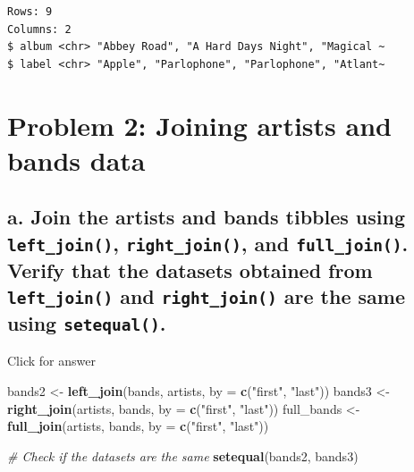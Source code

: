 \documentclass[
]{book}
\newenvironment{Shaded}{\begin{snugshade}}{\end{snugshade}}
\newcommand{\AttributeTok}[1]{\textcolor[rgb]{0.13,0.29,0.53}{#1}}
\newcommand{\CommentTok}[1]{\textcolor[rgb]{0.56,0.35,0.01}{\textit{#1}}}
\newcommand{\FunctionTok}[1]{\textcolor[rgb]{0.13,0.29,0.53}{\textbf{#1}}}
\newcommand{\NormalTok}[1]{#1}
\newcommand{\OtherTok}[1]{\textcolor[rgb]{0.56,0.35,0.01}{#1}}
\newcommand{\StringTok}[1]{\textcolor[rgb]{0.31,0.60,0.02}{#1}}
\begin{document}
\begin{verbatim}
Rows: 9
Columns: 2
$ album <chr> "Abbey Road", "A Hard Days Night", "Magical ~
$ label <chr> "Apple", "Parlophone", "Parlophone", "Atlant~
\end{verbatim}

\hypertarget{problem-2-joining-artists-and-bands-data}{%
\section{Problem 2: Joining artists and bands data}\label{problem-2-joining-artists-and-bands-data}}

\hypertarget{a.-join-the-artists-and-bands-tibbles-using-left_join-right_join-and-full_join.-verify-that-the-datasets-obtained-from-left_join-and-right_join-are-the-same-using-setequal.}{%
\subsection{\texorpdfstring{a. Join the artists and bands tibbles using \texttt{left\_join()}, \texttt{right\_join()}, and \texttt{full\_join()}. Verify that the datasets obtained from \texttt{left\_join()} and \texttt{right\_join()} are the same using \texttt{setequal()}.}{a. Join the artists and bands tibbles using left\_join(), right\_join(), and full\_join(). Verify that the datasets obtained from left\_join() and right\_join() are the same using setequal().}}\label{a.-join-the-artists-and-bands-tibbles-using-left_join-right_join-and-full_join.-verify-that-the-datasets-obtained-from-left_join-and-right_join-are-the-same-using-setequal.}}

Click for answer

\begin{Shaded}
\begin{Highlighting}[]
\NormalTok{bands2 }\OtherTok{\textless{}{-}} \FunctionTok{left\_join}\NormalTok{(bands, artists, }\AttributeTok{by =} \FunctionTok{c}\NormalTok{(}\StringTok{"first"}\NormalTok{, }\StringTok{"last"}\NormalTok{))}
\NormalTok{bands3 }\OtherTok{\textless{}{-}} \FunctionTok{right\_join}\NormalTok{(artists, bands, }\AttributeTok{by =} \FunctionTok{c}\NormalTok{(}\StringTok{"first"}\NormalTok{, }\StringTok{"last"}\NormalTok{))}
\NormalTok{full\_bands }\OtherTok{\textless{}{-}} \FunctionTok{full\_join}\NormalTok{(artists, bands, }\AttributeTok{by =} \FunctionTok{c}\NormalTok{(}\StringTok{"first"}\NormalTok{, }\StringTok{"last"}\NormalTok{))}

\CommentTok{\# Check if the datasets are the same}
\FunctionTok{setequal}\NormalTok{(bands2, bands3)}
\end{Highlighting}
\end{Shaded}
\end{document}
